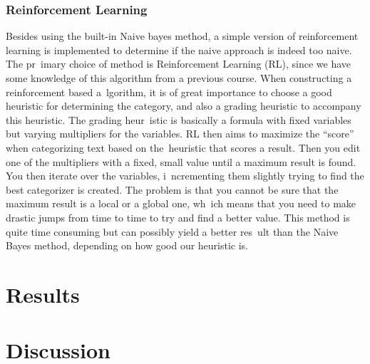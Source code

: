 \documentclass[a4paper]{article}
\begin{document}
\subsubsection{Reinforcement Learning}
Besides using the built-in Naive bayes method, a simple version of reinforcement learning is implemented to determine if the naive approach is indeed too naive. The pr\
imary choice of method is Reinforcement Learning (RL), since we have some knowledge of this algorithm from a previous course. When constructing a reinforcement based a\
lgorithm, it is of great importance to choose a good heuristic for determining the category, and also a grading heuristic to accompany this heuristic. The grading heur\
istic is basically a formula with fixed variables but varying multipliers for the variables. RL then aims to maximize the ``score'' when categorizing text based on the\
 heuristic that scores a result. Then you edit one of the multipliers with a fixed, small value until a maximum result is found. You then iterate over the variables, i\
ncrementing them slightly trying to find the best categorizer is created. The problem is that you cannot be sure that the maximum result is a local or a global one, wh\
ich means that you need to make drastic jumps from time to time to try and find a better value. This method is quite time consuming but can possibly yield a better res\
ult than the Naive Bayes method, depending on how good our heuristic is.

\section{Results}

\section{Discussion}
\end{document}
